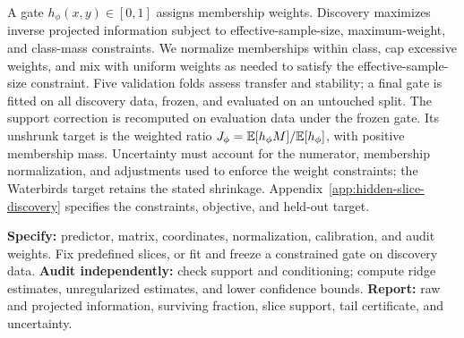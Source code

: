 A gate $h_\phi(x,y)\in[0,1]$ assigns membership weights. Discovery maximizes inverse projected information subject to effective-sample-size, maximum-weight, and class-mass constraints. We normalize memberships within class, cap excessive weights, and mix with uniform weights as needed to satisfy the effective-sample-size constraint. Five validation folds assess transfer and stability; a final gate is fitted on all discovery data, frozen, and evaluated on an untouched split. The support correction is recomputed on evaluation data under the frozen gate. Its unshrunk target is the weighted ratio $J_\phi=\mathbb{E}[h_\phi M]/\mathbb{E}[h_\phi]$, with positive membership mass. Uncertainty must account for the numerator, membership normalization, and adjustments used to enforce the weight constraints; the Waterbirds target retains the stated shrinkage. Appendix~\ref{app:hidden-slice-discovery} specifies the constraints, objective, and held-out target.

\begin{algorithm}[H]
\caption{Fisher-Glass audit}
\label{alg:fisher-glass-audit}
\begin{algorithmic}[1]
\State \textbf{Specify:} predictor, matrix, coordinates, normalization, calibration, and audit weights.
\State Fix predefined slices, or fit and freeze a constrained gate on discovery data.
\State \textbf{Audit independently:} check support and conditioning; compute ridge estimates, unregularized estimates, and lower confidence bounds.
\State \textbf{Report:} raw and projected information, surviving fraction, slice support, tail certificate, and uncertainty.
\end{algorithmic}
\end{algorithm}
